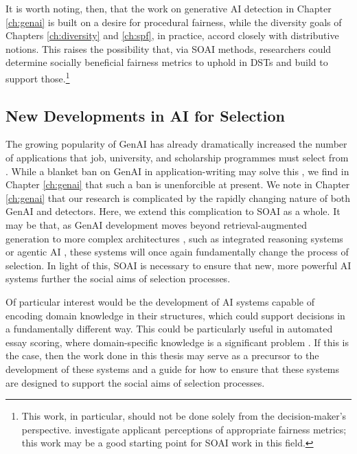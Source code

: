 It is worth noting, then, that the work on generative AI detection in Chapter \ref{ch:genai} is built on a desire for procedural fairness, while the diversity goals of Chapters \ref{ch:diversity} and \ref{ch:spf}, in practice, accord closely with distributive notions. This raises the possibility that, via SOAI methods, researchers could determine socially beneficial fairness metrics to uphold in DSTs and build to support those.\footnote{This work, in particular, should not be done solely from the decision-maker's perspective. \textcite{10.1145/3351095.3372867} investigate applicant perceptions of appropriate fairness metrics; this work may be a good starting point for SOAI work in this field.}


\subsection{New Developments in AI for Selection}
The growing popularity of GenAI has already dramatically increased the number of applications that job, university, and scholarship programmes must select from \cite{Kaashoek2024Impact}. While a blanket ban on GenAI in application-writing may solve this \cite{h_holden_thorp_chatgpt_2023}, we find in Chapter \ref{ch:genai} that such a ban is unenforcible at present. We note in Chapter \ref{ch:genai} that our research is complicated by the rapidly changing nature of both GenAI and detectors. Here, we extend this complication to SOAI as a whole. It may be that, as GenAI development moves beyond retrieval-augmented generation to more complex architectures \cite{lewis2020retrieval}, such as integrated reasoning systems or agentic AI \cite{OKeefeetal}, these systems will once again fundamentally change the process of selection. In light of this, SOAI is necessary to ensure that new, more powerful AI systems further the social aims of selection processes.

Of particular interest would be the development of AI systems capable of encoding domain knowledge in their structures, which could support decisions in a fundamentally different way. This could be particularly useful in automated essay scoring, where domain-specific knowledge is a significant problem \cite{elijahthesis}. If this is the case, then the work done in this thesis may serve as a precursor to the development of these systems and a guide for how to ensure that these systems are designed to support the social aims of selection processes.

